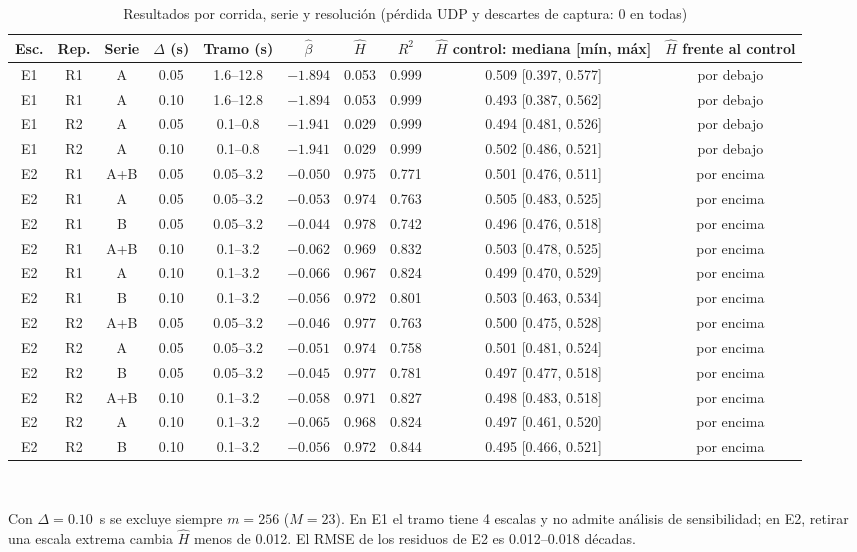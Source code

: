 \documentclass[conference,letterpaper]{IEEEtran}
\newcommand{\Hhat}{\hat{H}}
\newcommand{\bhat}{\hat{\beta}}
\begin{document}
\begin{table}[!t]
\caption{Resultados por corrida, serie y resolución (pérdida UDP y descartes de captura: 0 en todas)}
\label{tab:res}
\centering
\footnotesize
\begin{tabular}{@{}cccccccccc@{}}
\toprule
Esc. & Rep. & Serie & $\Delta$ (s) & Tramo (s) & $\bhat$ & $\Hhat$ & $R^2$ & $\Hhat$ control: mediana [mín, máx] & $\Hhat$ frente al control\\
\midrule
E1 & R1 & A & 0.05 & 1.6--12.8 & $-1.894$ & 0.053 & 0.999 & 0.509 [0.397, 0.577] & por debajo\\
E1 & R1 & A & 0.10 & 1.6--12.8 & $-1.894$ & 0.053 & 0.999 & 0.493 [0.387, 0.562] & por debajo\\
E1 & R2 & A & 0.05 & 0.1--0.8 & $-1.941$ & 0.029 & 0.999 & 0.494 [0.481, 0.526] & por debajo\\
E1 & R2 & A & 0.10 & 0.1--0.8 & $-1.941$ & 0.029 & 0.999 & 0.502 [0.486, 0.521] & por debajo\\
\midrule
E2 & R1 & A+B & 0.05 & 0.05--3.2 & $-0.050$ & 0.975 & 0.771 & 0.501 [0.476, 0.511] & por encima\\
E2 & R1 & A & 0.05 & 0.05--3.2 & $-0.053$ & 0.974 & 0.763 & 0.505 [0.483, 0.525] & por encima\\
E2 & R1 & B & 0.05 & 0.05--3.2 & $-0.044$ & 0.978 & 0.742 & 0.496 [0.476, 0.518] & por encima\\
E2 & R1 & A+B & 0.10 & 0.1--3.2 & $-0.062$ & 0.969 & 0.832 & 0.503 [0.478, 0.525] & por encima\\
E2 & R1 & A & 0.10 & 0.1--3.2 & $-0.066$ & 0.967 & 0.824 & 0.499 [0.470, 0.529] & por encima\\
E2 & R1 & B & 0.10 & 0.1--3.2 & $-0.056$ & 0.972 & 0.801 & 0.503 [0.463, 0.534] & por encima\\
E2 & R2 & A+B & 0.05 & 0.05--3.2 & $-0.046$ & 0.977 & 0.763 & 0.500 [0.475, 0.528] & por encima\\
E2 & R2 & A & 0.05 & 0.05--3.2 & $-0.051$ & 0.974 & 0.758 & 0.501 [0.481, 0.524] & por encima\\
E2 & R2 & B & 0.05 & 0.05--3.2 & $-0.045$ & 0.977 & 0.781 & 0.497 [0.477, 0.518] & por encima\\
E2 & R2 & A+B & 0.10 & 0.1--3.2 & $-0.058$ & 0.971 & 0.827 & 0.498 [0.483, 0.518] & por encima\\
E2 & R2 & A & 0.10 & 0.1--3.2 & $-0.065$ & 0.968 & 0.824 & 0.497 [0.461, 0.520] & por encima\\
E2 & R2 & B & 0.10 & 0.1--3.2 & $-0.056$ & 0.972 & 0.844 & 0.495 [0.466, 0.521] & por encima\\
\bottomrule
\end{tabular}\\[2pt]
\raggedright\scriptsize Con $\Delta = 0.10$~s se excluye siempre $m = 256$ ($M = 23$). En E1 el tramo tiene 4 escalas y no admite análisis de sensibilidad; en E2, retirar una escala extrema cambia $\Hhat$ menos de 0.012. El RMSE de los residuos de E2 es 0.012--0.018 décadas.
\end{table}
\end{document}
